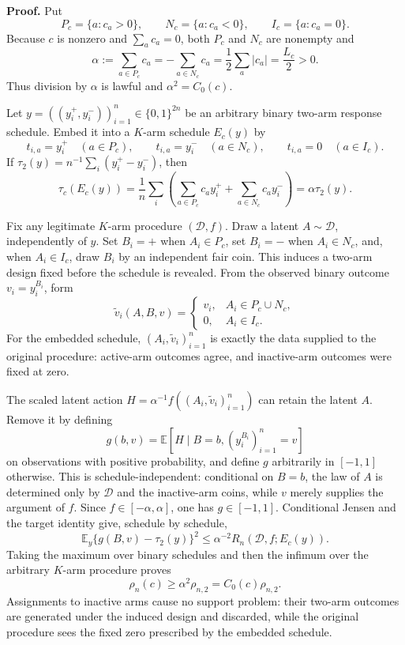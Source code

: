 \textbf{Proof.}
Put
\[
 P_c=\{a:c_a>0\},\qquad N_c=\{a:c_a<0\},\qquad I_c=\{a:c_a=0\}.
\]
Because \(c\) is nonzero and \(\sum_a c_a=0\), both \(P_c\) and \(N_c\) are nonempty and
\[
 \alpha:=\sum_{a\in P_c}c_a=-\sum_{a\in N_c}c_a
 =\frac12\sum_a|c_a|=\frac{L_c}{2}>0.
\]
Thus division by \(\alpha\) is lawful and \(\alpha^2=C_0(c)\).

Let \(y=((y_i^+,y_i^-))_{i=1}^n\in\{0,1\}^{2n}\) be an arbitrary binary two-arm response schedule. Embed it into a \(K\)-arm schedule \(E_c(y)\) by
\[
 t_{i,a}=y_i^+\quad(a\in P_c),\qquad
 t_{i,a}=y_i^-\quad(a\in N_c),\qquad
 t_{i,a}=0\quad(a\in I_c).
\]
If \(\tau_2(y)=n^{-1}\sum_i(y_i^+-y_i^-)\), then
\[
 \tau_c(E_c(y))
 =\frac1n\sum_i\left(\sum_{a\in P_c}c_ay_i^+
 +\sum_{a\in N_c}c_ay_i^-\right)
 =\alpha\tau_2(y).
\]

Fix any legitimate \(K\)-arm procedure \((\mathcal D,f)\). Draw a latent \(A\sim\mathcal D\), independently of \(y\). Set \(B_i=+\) when \(A_i\in P_c\), set \(B_i=-\) when \(A_i\in N_c\), and, when \(A_i\in I_c\), draw \(B_i\) by an independent fair coin. This induces a two-arm design fixed before the schedule is revealed. From the observed binary outcome \(v_i=y_i^{B_i}\), form
\[
 \widetilde v_i(A,B,v)=
 \begin{cases}
 v_i,&A_i\in P_c\cup N_c,\\
 0,&A_i\in I_c.
 \end{cases}
\]
For the embedded schedule, \((A_i,\widetilde v_i)_{i=1}^n\) is exactly the data supplied to the original procedure: active-arm outcomes agree, and inactive-arm outcomes were fixed at zero.

The scaled latent action \(H=\alpha^{-1}f((A_i,\widetilde v_i)_{i=1}^n)\) can retain the latent \(A\). Remove it by defining
\[
 g(b,v)=\mathbb E\!\left[H\mid B=b,(y_i^{B_i})_{i=1}^n=v\right]
\]
on observations with positive probability, and define \(g\) arbitrarily in \([-1,1]\) otherwise. This is schedule-independent: conditional on \(B=b\), the law of \(A\) is determined only by \(\mathcal D\) and the inactive-arm coins, while \(v\) merely supplies the argument of \(f\). Since \(f\in[-\alpha,\alpha]\), one has \(g\in[-1,1]\). Conditional Jensen and the target identity give, schedule by schedule,
\[
 \mathbb E_y\{g(B,v)-\tau_2(y)\}^2
 \leq\alpha^{-2}R_n(\mathcal D,f;E_c(y)).
\]
Taking the maximum over binary schedules and then the infimum over the arbitrary \(K\)-arm procedure proves
\[
 \rho_n(c)\geq\alpha^2\rho_{n,2}=C_0(c)\rho_{n,2}.
\]
Assignments to inactive arms cause no support problem: their two-arm outcomes are generated under the induced design and discarded, while the original procedure sees the fixed zero prescribed by the embedded schedule.

